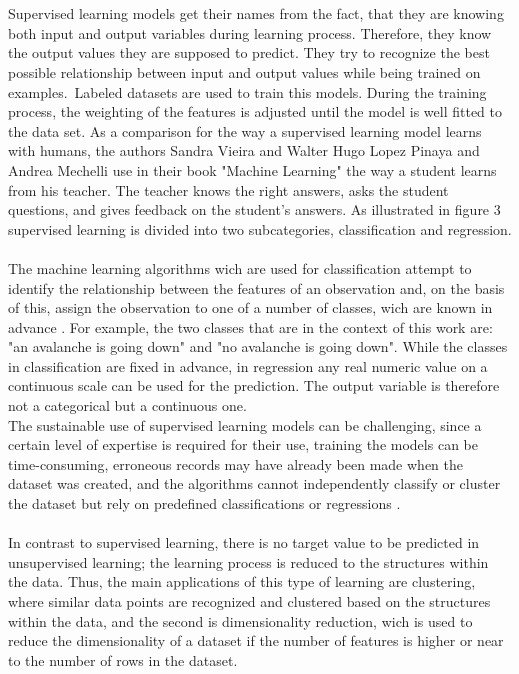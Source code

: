 \documentclass[../masterarbeit.tex]{subfiles}
\begin{document}
 \\~\\
Supervised learning models get their names from the fact, that they are knowing both input and output variables during learning process. Therefore, they know the output values they are supposed to predict. They try to recognize the best possible relationship between input and output values while being trained on examples. Labeled datasets are used to train this models. During the training process, the weighting of the features is adjusted until the model is well fitted to the data set. \autocite[]{VIEIRA20201} \autocite[]{ibm-supervised-learning:2022}
As a comparison for the way a supervised learning model learns with humans, the authors Sandra Vieira and Walter Hugo Lopez Pinaya and Andrea Mechelli use in their book "Machine Learning" the way a student learns from his teacher. The teacher knows the right answers, asks the student questions, and gives feedback on the student's answers. \autocite[]{VIEIRA20201}
As illustrated in figure 3 supervised learning is divided into two subcategories, classification and regression. \\~\\
The machine learning algorithms wich are used for classification attempt to identify the relationship between the features of an observation and, on the basis of this, assign the observation to one of a number of classes, wich are known in advance \textcite[]{VIEIRA20201} \textcite[]{SUBASI202091}. For example, the two classes that are in the context of this work are: "an avalanche is going down" and "no avalanche is going down". 
While the classes in classification are fixed in advance, in regression any real numeric value on a continuous scale can be used for the prediction. The output variable is therefore not a categorical but a continuous one. \autocite[]{VIEIRA20201} \autocite[]{SUBASI202091} \\
The sustainable use of supervised learning models can be challenging, since a certain level of expertise is required for their use, training the models can be time-consuming, erroneous records may have already been made when the dataset was created, and the algorithms cannot independently classify or cluster the dataset but rely on predefined classifications or regressions \textcite[]{ibm-supervised-learning:2022}. \\~\\
In contrast to supervised learning, there is no target value to be predicted in unsupervised learning; the learning process is reduced to the structures within the data. Thus, the main applications of this type of learning are clustering, where similar data points are recognized and clustered based on the structures within the data, and the second is dimensionality reduction, wich is used to reduce the dimensionality of a dataset if the number of features is higher or near to the number of rows in the dataset.\autocite[]{ibm-supervised-learning:2022} \autocite[]{VIEIRA20201} \\~\\
\end{document}
